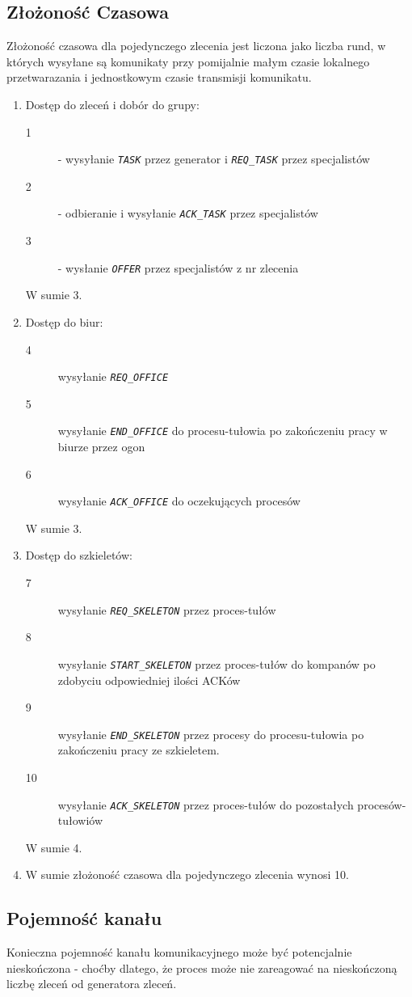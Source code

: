 \documentclass[12pt]{article}
\newcommand{\msg}[1]{\texttt{\emph{#1}}}
\begin{document}
\subsection{Złożoność Czasowa}
Złożoność czasowa dla pojedynczego zlecenia jest liczona jako liczba rund, w których wysyłane są komunikaty przy pomijalnie małym czasie lokalnego przetwarazania i jednostkowym czasie transmisji komunikatu.
\begin{enumerate}
	\item Dostęp do zleceń i dobór do grupy:
	\begin{description}
		\item[1] - wysyłanie \msg{TASK} przez generator i \msg{REQ\_TASK} przez specjalistów
		\item[2] - odbieranie i wysyłanie \msg{ACK\_TASK} przez specjalistów
		\item[3] - wysłanie \msg{OFFER} przez specjalistów z nr zlecenia
	\end{description}
	W sumie 3.
	
	\item Dostęp do biur:
	\begin{description}
		\item[4] wysyłanie \msg{REQ\_OFFICE}
		\item[5] wysyłanie \msg{END\_OFFICE} do procesu-tułowia po zakończeniu pracy w biurze przez ogon
		\item[6] wysyłanie \msg{ACK\_OFFICE} do oczekujących procesów
	\end{description}
	W sumie 3.
	
	\item Dostęp do szkieletów:
	\begin{description}
		\item[7] wysyłanie \msg{REQ\_SKELETON} przez proces-tułów
		\item[8] wysyłanie \msg{START\_SKELETON} przez proces-tułów do kompanów po zdobyciu odpowiedniej ilości ACKów
		\item[9] wysyłanie \msg{END\_SKELETON} przez procesy do procesu-tułowia po zakończeniu pracy ze szkieletem.
		\item[10] wysyłanie \msg{ACK\_SKELETON} przez proces-tułów do pozostałych procesów-tułowiów
	\end{description}
	W sumie 4.
	\item W sumie złożoność czasowa dla pojedynczego zlecenia wynosi 10.
	
\end{enumerate}

\subsection{Pojemność kanału}
Konieczna pojemność kanału komunikacyjnego może być potencjalnie nieskończona - choćby dlatego, że proces może nie zareagować na nieskończoną liczbę zleceń od generatora zleceń.
\end{document}
